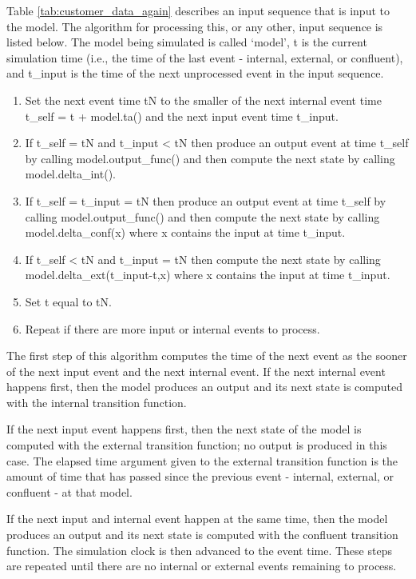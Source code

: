 Table \ref{tab:customer_data_again} describes an input sequence that is input to the  model. The algorithm for processing this, or any other, input sequence is listed below. The  model being simulated is called `model', t is the current simulation time (i.e., the time of the last event - internal, external, or confluent), and t\_input is the time of the next unprocessed event in the input sequence. 
\begin{enumerate}
\item Set the next event time tN to the smaller of the next internal event time t\_self = t + model.ta() and the next input event time t\_input.
\item If t\_self = tN and t\_input < tN then produce an output event at time t\_self by calling model.output\_func() and then compute the next state by calling model.delta\_int().
\item If t\_self = t\_input = tN then produce an output event at time t\_self by calling model.output\_func() and then compute the next state by calling model.delta\_conf(x) where x contains the input at time t\_input.
\item If t\_self < tN and t\_input = tN then compute the next state by calling model.delta\_ext(t\_input-t,x) where x contains the input at time t\_input.
\item Set t equal to tN.
\item Repeat if there are more input or internal events to process.
\end{enumerate}

The first step of this algorithm computes the time of the next event as the sooner of the next input event and the next internal event. If the next internal event happens first, then the model produces an output and its next state is computed with the internal transition function.

If the next input event happens first, then the next state of the model is computed with the external transition function; no output is produced in this case. The elapsed time argument given to the external transition function is the amount of time that has passed since the previous event - internal, external, or confluent - at that model. 

If the next input and internal event happen at the same time, then the model produces an output and its next state is computed with the confluent transition function. The simulation clock is then advanced to the event time. These steps are repeated until there are no internal or external events remaining to process. 

